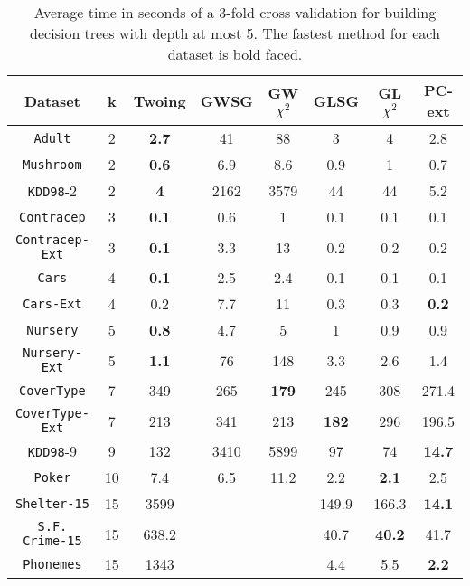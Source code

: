 \begin{table*}[]
\small
\centering
\caption{Average time in seconds of a 3-fold cross validation
for building decision trees with depth at most 5.
The fastest method for each dataset is bold faced.}
\begin{tabular}{c|c|c|c|c|c|c|c}
Dataset             & k  & Twoing    & GWSG  & GW$\chi^2$ & GLSG      & GL$\chi^2$ & PC-ext     \\ \hline
{\tt Adult}         & 2  & {\bf  2.7} & 41   & 88         & 3         & 4          & 2.8        \\
{\tt Mushroom}      & 2  & {\bf 0.6} & 6.9  & 8.6         & 0.9       & 1          & 0.7        \\
{\tt KDD98}-2       & 2  & {\bf 4}   & 2162 & 3579        & 44        & 44         & 5.2        \\
{\tt Contracep}     & 3  & {\bf 0.1} & 0.6  & 1           & 0.1       & 0.1        & 0.1        \\
{\tt Contracep-Ext} & 3  & {\bf 0.1} & 3.3  & 13          & 0.2       & 0.2        & 0.2        \\
{\tt Cars}          & 4  & {\bf 0.1} & 2.5  & 2.4         & 0.1       & 0.1        & 0.1        \\
{\tt Cars-Ext}      & 4  & 0.2       & 7.7  & 11          & 0.3       & 0.3        & {\bf 0.2}  \\
{\tt Nursery}       & 5  & {\bf 0.8} & 4.7  & 5           & 1         & 0.9        & 0.9        \\
{\tt Nursery-Ext}   & 5  & {\bf 1.1} & 76   & 148         & 3.3       & 2.6        & 1.4        \\
{\tt CoverType}     & 7  & 349       & 265  & {\bf 179}   & 245       & 308        & 271.4      \\
{\tt CoverType-Ext} & 7  & 213       & 341  & 213         & {\bf 182} & 296        & 196.5      \\
{\tt KDD98}-9       & 9  & 132       & 3410 & 5899        & 97        & 74         & {\bf 14.7 }\\ 
{\tt Poker}         & 10 & 7.4       & 6.5  & 11.2        & 2.2       & {\bf 2.1}  & 2.5        \\
{\tt Shelter-15}    & 15 & 3599      &      &             & 149.9     & 166.3      & {\bf 14.1 }\\   
{\tt S.F. Crime-15} & 15 & 638.2     &      &             & 40.7      & {\bf 40.2} & 41.7       \\ 
{\tt Phonemes}      & 15 & 1343      &      &             &      4.4  & 5.5        & {\bf 2.2 }
\end{tabular}
\label{tab:time-5}
\end{table*}



